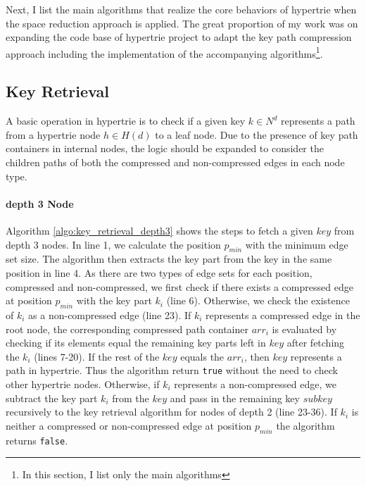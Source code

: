Next, I list the main algorithms that realize the core behaviors of hypertrie when the space reduction approach is applied. The great proportion of my work was on expanding the code base of hypertrie project to adapt the key path compression approach including the implementation of the accompanying algorithms\footnote{In this section, I list only the main algorithms}.

\subsection{Key Retrieval}
A basic operation in hypertrie is to check if a given key $k \in N^d$ represents a path from a hypertrie node $h \in H(d)$ to a leaf node. Due to the presence of key path containers in internal nodes, the logic should be expanded to consider the children paths of both the compressed and non-compressed edges in each node type. \\

\paragraph{depth 3 Node} Algorithm \ref{algo:key_retrieval_depth3} shows the steps to fetch a given $key$ from depth 3 nodes. In line 1, we calculate the position $p_{min}$ with the minimum edge set size. The algorithm then extracts the key part from the key in the same position in line 4. As there are two types of edge sets for each position, compressed and non-compressed, we first check if there exists a compressed edge at position $p_{min}$ with the key part $k_i$ (line 6). Otherwise, we check the existence of $k_i$ as a non-compressed edge (line 23). If $k_i$ represents a compressed edge in the root node, the corresponding compressed path container $arr_i$ is evaluated by checking if its elements equal the remaining key parts left in $key$ after fetching the $k_i$ (lines 7-20). If the rest of the $key$ equals the $arr_i$, then $key$ represents a path in hypertrie. Thus the algorithm return \verb|true| without the need to check other hypertrie nodes. Otherwise, if $k_i$ represents a non-compressed edge, we subtract the key part $k_i$ from the $key$ and pass in the remaining key $subkey$ recursively to the key retrieval algorithm for nodes of depth 2 (line 23-36). If $k_i$ is neither a compressed or non-compressed edge at position $p_{min}$ the algorithm returns \verb|false|.


